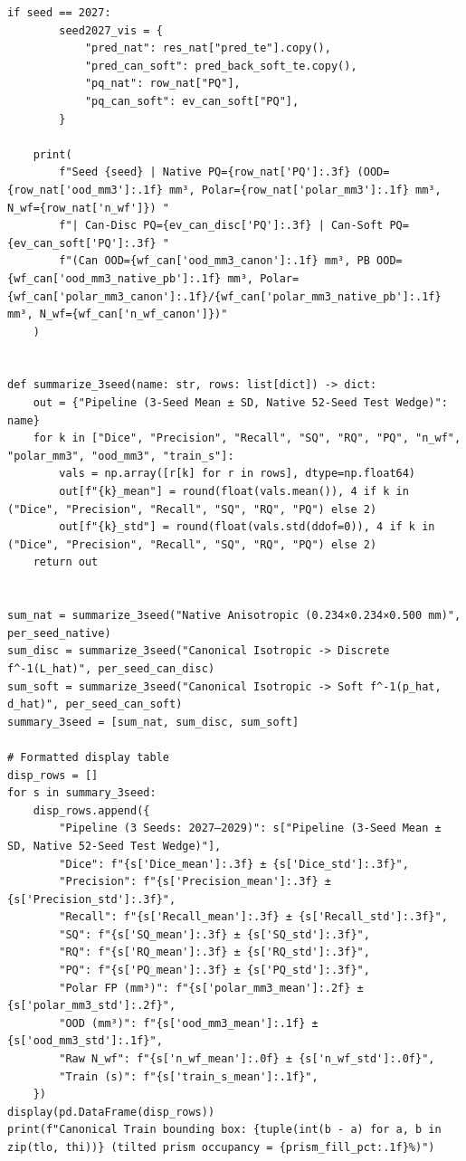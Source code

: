 \documentclass[10pt,a4paper]{article}
\renewcommand{\_}{\origunderscore\allowbreak}
\begin{document}
\begin{codebox}
\begin{lstlisting}[style=pybmed]
    if seed == 2027:
        seed2027_vis = {
            "pred_nat": res_nat["pred_te"].copy(),
            "pred_can_soft": pred_back_soft_te.copy(),
            "pq_nat": row_nat["PQ"],
            "pq_can_soft": ev_can_soft["PQ"],
        }

    print(
        f"Seed {seed} | Native PQ={row_nat['PQ']:.3f} (OOD={row_nat['ood_mm3']:.1f} mm³, Polar={row_nat['polar_mm3']:.1f} mm³, N_wf={row_nat['n_wf']}) "
        f"| Can-Disc PQ={ev_can_disc['PQ']:.3f} | Can-Soft PQ={ev_can_soft['PQ']:.3f} "
        f"(Can OOD={wf_can['ood_mm3_canon']:.1f} mm³, PB OOD={wf_can['ood_mm3_native_pb']:.1f} mm³, Polar={wf_can['polar_mm3_canon']:.1f}/{wf_can['polar_mm3_native_pb']:.1f} mm³, N_wf={wf_can['n_wf_canon']})"
    )


def summarize_3seed(name: str, rows: list[dict]) -> dict:
    out = {"Pipeline (3-Seed Mean ± SD, Native 52-Seed Test Wedge)": name}
    for k in ["Dice", "Precision", "Recall", "SQ", "RQ", "PQ", "n_wf", "polar_mm3", "ood_mm3", "train_s"]:
        vals = np.array([r[k] for r in rows], dtype=np.float64)
        out[f"{k}_mean"] = round(float(vals.mean()), 4 if k in ("Dice", "Precision", "Recall", "SQ", "RQ", "PQ") else 2)
        out[f"{k}_std"] = round(float(vals.std(ddof=0)), 4 if k in ("Dice", "Precision", "Recall", "SQ", "RQ", "PQ") else 2)
    return out


sum_nat = summarize_3seed("Native Anisotropic (0.234×0.234×0.500 mm)", per_seed_native)
sum_disc = summarize_3seed("Canonical Isotropic -> Discrete f^-1(L_hat)", per_seed_can_disc)
sum_soft = summarize_3seed("Canonical Isotropic -> Soft f^-1(p_hat, d_hat)", per_seed_can_soft)
summary_3seed = [sum_nat, sum_disc, sum_soft]

# Formatted display table
disp_rows = []
for s in summary_3seed:
    disp_rows.append({
        "Pipeline (3 Seeds: 2027–2029)": s["Pipeline (3-Seed Mean ± SD, Native 52-Seed Test Wedge)"],
        "Dice": f"{s['Dice_mean']:.3f} ± {s['Dice_std']:.3f}",
        "Precision": f"{s['Precision_mean']:.3f} ± {s['Precision_std']:.3f}",
        "Recall": f"{s['Recall_mean']:.3f} ± {s['Recall_std']:.3f}",
        "SQ": f"{s['SQ_mean']:.3f} ± {s['SQ_std']:.3f}",
        "RQ": f"{s['RQ_mean']:.3f} ± {s['RQ_std']:.3f}",
        "PQ": f"{s['PQ_mean']:.3f} ± {s['PQ_std']:.3f}",
        "Polar FP (mm³)": f"{s['polar_mm3_mean']:.2f} ± {s['polar_mm3_std']:.2f}",
        "OOD (mm³)": f"{s['ood_mm3_mean']:.1f} ± {s['ood_mm3_std']:.1f}",
        "Raw N_wf": f"{s['n_wf_mean']:.0f} ± {s['n_wf_std']:.0f}",
        "Train (s)": f"{s['train_s_mean']:.1f}",
    })
display(pd.DataFrame(disp_rows))
print(f"Canonical Train bounding box: {tuple(int(b - a) for a, b in zip(tlo, thi))} (tilted prism occupancy = {prism_fill_pct:.1f}%)")


\end{lstlisting}
\end{codebox}
\end{document}
